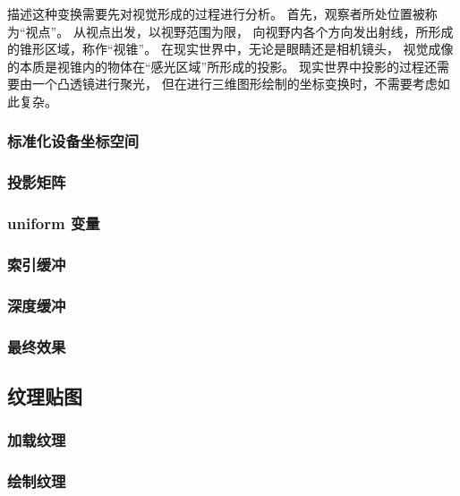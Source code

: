 \documentclass[fontset=windows]{ctexart}
\begin{document}
描述这种变换需要先对视觉形成的过程进行分析。
首先，观察者所处位置被称为“视点”。
从视点出发，以视野范围为限，
向视野内各个方向发出射线，所形成的锥形区域，称作“视锥”。
在现实世界中，无论是眼睛还是相机镜头，
视觉成像的本质是视锥内的物体在“感光区域”所形成的投影。
现实世界中投影的过程还需要由一个凸透镜进行聚光，
但在进行三维图形绘制的坐标变换时，不需要考虑如此复杂。



\subsubsection{标准化设备坐标空间}

\subsubsection{投影矩阵}

\label{sec-gl:projection-matrix}



\subsubsection{uniform 变量}

\subsubsection{索引缓冲}

\subsubsection{深度缓冲}

\subsubsection{最终效果}

\subsection{纹理贴图}

\subsubsection{加载纹理}

\subsubsection{绘制纹理}
\end{document}
